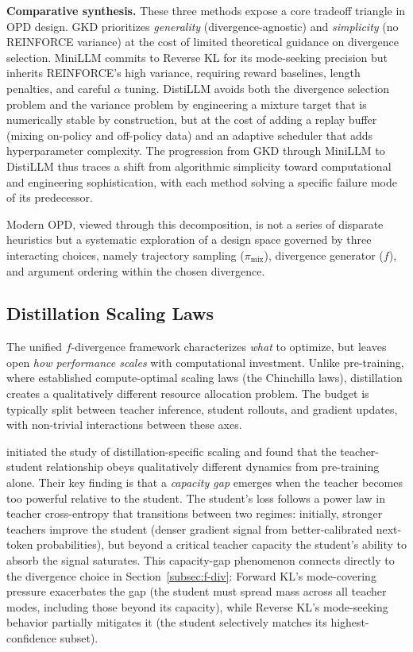 \documentclass{article} %
\begin{document}
\textbf{Comparative synthesis.} These three methods expose a core tradeoff triangle in OPD design. GKD prioritizes \emph{generality} (divergence-agnostic) and \emph{simplicity} (no REINFORCE variance) at the cost of limited theoretical guidance on divergence selection. MiniLLM commits to Reverse KL for its mode-seeking precision but inherits REINFORCE's high variance, requiring reward baselines, length penalties, and careful $\alpha$ tuning. DistiLLM avoids both the divergence selection problem and the variance problem by engineering a mixture target that is numerically stable by construction, but at the cost of adding a replay buffer (mixing on-policy and off-policy data) and an adaptive scheduler that adds hyperparameter complexity. The progression from GKD through MiniLLM to DistiLLM thus traces a shift from algorithmic simplicity toward computational and engineering sophistication, with each method solving a specific failure mode of its predecessor.

Modern OPD, viewed through this decomposition, is not a series of disparate heuristics but a systematic exploration of a design space governed by three interacting choices, namely trajectory sampling ($\pi_{\mathrm{mix}}$), divergence generator ($f$), and argument ordering within the chosen divergence.

\subsection{Distillation Scaling Laws}
\label{subsec:scaling}

The unified $f$-divergence framework characterizes \emph{what} to optimize, but leaves open \emph{how performance scales} with computational investment. Unlike pre-training, where \citet{2203.15556} established compute-optimal scaling laws (the Chinchilla laws), distillation creates a qualitatively different resource allocation problem. The budget is typically split between teacher inference, student rollouts, and gradient updates, with non-trivial interactions between these axes.

\citet{2502.08606} initiated the study of distillation-specific scaling and found that the teacher-student relationship obeys qualitatively different dynamics from pre-training alone. Their key finding is that a \emph{capacity gap} emerges when the teacher becomes too powerful relative to the student. The student's loss follows a power law in teacher cross-entropy that transitions between two regimes: initially, stronger teachers improve the student (denser gradient signal from better-calibrated next-token probabilities), but beyond a critical teacher capacity the student's ability to absorb the signal saturates. This capacity-gap phenomenon connects directly to the divergence choice in Section~\ref{subsec:f-div}: Forward KL's mode-covering pressure exacerbates the gap (the student must spread mass across all teacher modes, including those beyond its capacity), while Reverse KL's mode-seeking behavior partially mitigates it (the student selectively matches its highest-confidence subset).
\end{document}
